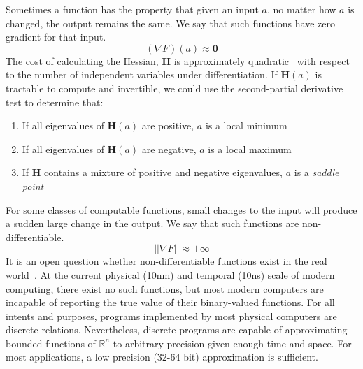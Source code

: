 \documentclass[12pt,initial,twoside,maitrise]{dms}
\numberwithin{equation}{section}
\numberwithin{table}{chapter}
\numberwithin{figure}{chapter}
\begin{document}
\noindent Sometimes a function has the property that given an input $a$, no matter how $a$ is changed, the output remains the same. We say that such functions have zero gradient for that input.
%
\begin{equation}
    (\nabla F)(a) \approx \mathbf{0}
\end{equation}
%
The cost of calculating the Hessian, $\mathbf{H}$ is approximately quadratic~\citep{griewank1993some} with respect to the number of independent variables under differentiation. If $\mathbf{H}(a)$ is tractable to compute and invertible, we could use the second-partial derivative test to determine that:\\
%
\begin{enumerate}
    \item If all eigenvalues of $\mathbf{H}(a)$ are positive, $a$ is a local minimum
    \item If all eigenvalues of $\mathbf{H}(a)$ are negative, $a$ is a local maximum
    \item If $\mathbf{H}$ contains a mixture of positive and negative eigenvalues, $a$ is a \textit{saddle point}\\
\end{enumerate}
%
For some classes of computable functions, small changes to the input will produce a sudden large change in the output. We say that such functions are non-differentiable.
%
\begin{equation}
    ||\nabla F|| \approx \pm \infty
\end{equation}
%
It is an open question whether non-differentiable functions exist in the real world~\citep{buniy2005hilbert}. At the current physical (10nm) and temporal (10ns) scale of modern computing, there exist no such functions, but most modern computers are incapable of reporting the true value of their binary-valued functions. For all intents and purposes, programs implemented by most physical computers are discrete relations. Nevertheless, discrete programs are capable of approximating bounded functions of $\mathbb{R}^n$ to arbitrary precision given enough time and space. For most applications, a low precision (32-64 bit) approximation is sufficient.
\end{document}
